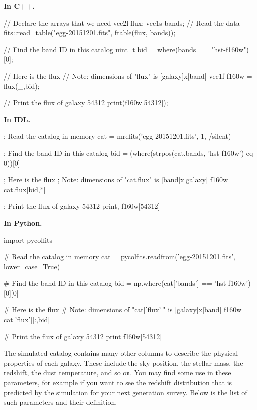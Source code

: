 {\bf In C++.}
\begin{cppcode}
// Declare the arrays that we need
vec2f flux;
vec1s bands;
// Read the data
fits::read_table("egg-20151201.fits", ftable(flux, bands));

// Find the band ID in this catalog
uint_t bid = where(bands == "hst-f160w")[0];

// Here is the flux
// Note: dimensions of "flux" is [galaxy]x[band]
vec1f f160w = flux(_,bid);

// Print the flux of galaxy 54312
print(f160w[54312]);
\end{cppcode}

{\bf In IDL.}
\begin{idlcode}
; Read the catalog in memory
cat = mrdfits('egg-20151201.fits', 1, /silent)

; Find the band ID in this catalog
bid = (where(strpos(cat.bands, 'hst-f160w') eq 0))[0]

; Here is the flux
; Note: dimensions of "cat.flux" is [band]x[galaxy]
f160w = cat.flux[bid,*]

; Print the flux of galaxy 54312
print, f160w[54312]
\end{idlcode}

{\bf In Python.}
\begin{pythoncode}
import pycolfits

# Read the catalog in memory
cat = pycolfits.readfrom('egg-20151201.fits', lower_case=True)

# Find the band ID in this catalog
bid = np.where(cat['bands'] == 'hst-f160w')[0][0]

# Here is the flux
# Note: dimensions of "cat['flux']" is [galaxy]x[band]
f160w = cat['flux'][:,bid]

# Print the flux of galaxy 54312
print f160w[54312]
\end{pythoncode}

The simulated catalog contains many other columns to describe the physical properties of each galaxy. These include the sky position, the stellar mass, the redshift, the dust temperature, and so on. You may find some use in these parameters, for example if you want to see the redshift distribution that is predicted by the simulation for your next generation survey. Below is the list of such parameters and their definition.


